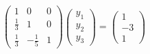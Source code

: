 \documentclass[preview]{standalone}
\begin{document}
\begin{align*}
\begin{pmatrix}1 & 0 & 0 \\\frac{1}{3} & 1 & 0 \\\frac{1}{3} & -\frac{1}{5} & 1\end{pmatrix}\begin{pmatrix} y_1 \\ y_2 \\ y_3 \end{pmatrix}= \begin{pmatrix} 1 \\ -3 \\ 1 \end{pmatrix}
\end{align*}
\end{document}
